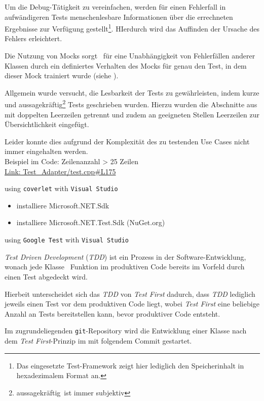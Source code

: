 Um die Debug-Tätigkeit zu vereinfachen, werden für einen Fehlerfall in aufwändigeren Tests menschenlesbare Informationen über die errechneten Ergebnisse zur Verfügung gestellt\footnote{Das eingesetzte Test-Framework zeigt hier lediglich den Speicherinhalt in hexadezimalem Format an.}. HIerdurch wird das Auffinden der Ursache des Fehlers erleichtert.

Die Nutzung von Mocks sorgt \ua\ für eine Unabhängigkeit von Fehlerfällen anderer Klassen durch ein definiertes Verhalten des Mocks für genau den Test, in dem dieser Mock trainiert wurde (siehe ).


Allgemein wurde versucht, die Lesbarkeit der Tests zu gewährleisten, indem kurze und aussagekräftig\footnote{\glq aussagekräftig\grq\ ist immer subjektiv} Tests geschrieben wurden.
Hierzu wurden die Abschnitte aus  mit doppelten Leerzeilen getrennt und zudem an geeigneten Stellen Leerzeilen zur Übersichtlichkeit eingefügt.

Leider konnte dies aufgrund der Komplexität des zu testenden Use Cases nicht immer eingehalten werden.\\
Beispiel im Code: Zeilenanzahl > 25 Zeilen\\ \href{https://github.com/MobMonRob/ROSLabDrohne/blob/9edc7b5814c1bb731abf0f7af4352289e57b681f/Code/Test\_Adapter/test.cpp\#L175}{Link: Test\_Adapter/test.cpp\#L175}










using \texttt{coverlet} with \texttt{Visual Studio}



\begin{itemize}
\item installiere Microsoft.NET.Sdk
\item installiere Microsoft.NET.Test.Sdk (NuGet.org)



\end{itemize}


using \texttt{Google Test} with \texttt{Visual Studio}






\textit{Test Driven Development} (\textit{TDD}) ist ein Prozess in der Software-Entwicklung, wonach jede Klasse \bzw\ Funktion im produktiven Code bereits im Vorfeld durch einen Test abgedeckt wird.

Hierbeit unterscheidet sich das \textit{TDD} von \textit{Test First} dadurch, dass \textit{TDD} lediglich jeweils einen Test vor dem produktiven Code liegt, wobei \textit{Test First} eine beliebige Anzahl an Tests bereitstellen kann, bevor produktiver Code entsteht.

Im zugrundeliegenden \texttt{git}-Repository wird die Entwicklung einer Klasse nach dem \textit{Test First}-Prinzip im  mit folgendem Commit gestartet.

